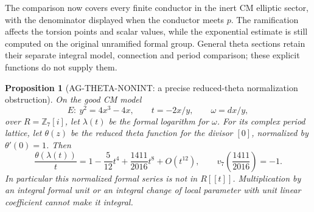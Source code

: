 \documentclass[11pt,a4paper]{article}
\newtheorem{proposition}{Proposition}
\begin{document}
The comparison now covers every finite conductor in the inert
CM elliptic sector, with the denominator displayed when the
conductor meets $p$. The ramification affects the torsion points
and scalar values, while the exponential estimate is still
computed on the original unramified formal group. General theta
sections retain their separate integral model, connection and
period comparison; these explicit functions do not supply them.

\begin{proposition}[AG-THETA-NONINT: a precise reduced-theta normalization obstruction]
On the good CM model
\[
 E:\ y^2=4x^3-4x,\qquad t=-2x/y,\qquad\omega=dx/y,
\]
over $R=\mathbb Z_7[i]$, let $\lambda(t)$ be the formal logarithm
for $\omega$. For its complex period lattice, let $\theta(z)$
be the reduced theta function for the divisor $[0]$, normalized
by $\theta'(0)=1$. Then
\begin{equation}\label{eq:ag-theta-nonintegral}
 \frac{\theta(\lambda(t))}{t}
   =1-\frac5{12}t^4+\frac{1411}{2016}t^8+O(t^{12}),
 \qquad v_7\left(\frac{1411}{2016}\right)=-1.
\end{equation}
In particular this normalized formal series is not in $R[[t]]$.
Multiplication by an integral formal unit or an integral change
of local parameter with unit linear coefficient cannot make it
integral.
\end{proposition}
\end{document}
